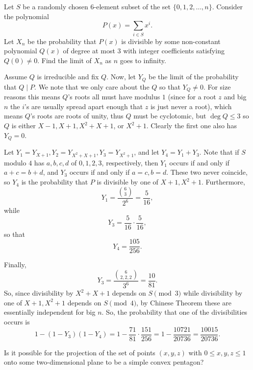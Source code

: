 \documentclass[11pt]{article}
\theoremstyle{definition}
\begin{document}
\begin{question}[name={2018 HMMT, Algebra \& Number Theory, \href{https://artofproblemsolving.com/community/c129h1590239p9853149}{Problem 10}}]
	Let $S$ be a randomly chosen $6$-element subset of the set $\{0,1,2,\ldots,n\}.$ Consider the polynomial $$P(x)=\sum_{i\in S}x^i.$$ Let $X_n$ be the probability that $P(x)$ is divisible by some non-constant polynomial $Q(x)$ of degree at most $3$ with integer coefficients satisfying $Q(0) \neq 0.$ Find the limit of $X_n$ as $n$ goes to infinity.	
\end{question}




\begin{solution}[name={Solution by MathStudent2002}]
	Assume $Q$ is irreducible and fix $Q$. Now, let $Y_Q$ be the limit of the probability that $Q\mid P$. We note that we only care about the $Q$ so that $Y_Q\neq 0$. For size reasons this means $Q$'s roots all must have modulus $1$ (since for a root $z$ and big $n$ the $i$'s are usually spread apart enough that $z$ is just never a root), which means $Q$'s roots are roots of unity, thus $Q$ must be cyclotomic, but $\deg Q \leq 3$ so $Q$ is either $X-1, X+1, X^2+X+1$, or $X^2+1$. Clearly the first one also has $Y_Q = 0$.
	
	Let $Y_1 = Y_{X+1}, Y_2 = Y_{X^2+X+1}, Y_3 = Y_{X^2+1}$, and let $Y_4 = Y_1+Y_3$. Note that if $S$ modulo $4$ has $a,b,c,d$ of $0,1,2,3$, respectively, then $Y_1$ occurs if and only if $a+c = b+d$, and $Y_3$ occurs if and only if $a = c, b=d$. These two never coincide, so $Y_4$ is the probability that $P$ is divisible by one of $X+1, X^2+1$. Furthermore, $$Y_1 = \frac{\binom 63}{2^6} = \frac{5}{16},$$ while $$Y_3 = \frac{5}{16} \cdot \frac{5}{16},$$ so that $$Y_4 = \frac{105}{256}.$$
	
	Finally, $$Y_3 = \frac{\binom{6}{2,2,2}}{3^6} = \frac{10}{81}.$$ So, since divisibility by $X^2+X+1$ depends on $S\pmod 3$ while divisibility by one of $X+1, X^2+1$ depends on $S\pmod 4$, by Chinese Theorem these are essentially independent for big $n$. So, the probability that one of the divisibilities occurs is\[
	1-(1-Y_3)(1-Y_4) = 1 - \frac{71}{81}\cdot \frac{151}{256} = 1 - \frac{10721}{20736} = \boxed{\frac{10015}{20736}}.
	\]
\end{solution}





\begin{question}[name={2018 HMMT, Team, \href{https://artofproblemsolving.com/community/c129h1590292p9853489}{Problem 5}}]
	Is it possible for the projection of the set of points $(x, y, z)$ with $0 \leq x, y, z \leq 1$ onto some two-dimensional plane to be a simple convex pentagon?
\end{question}
\end{document}
